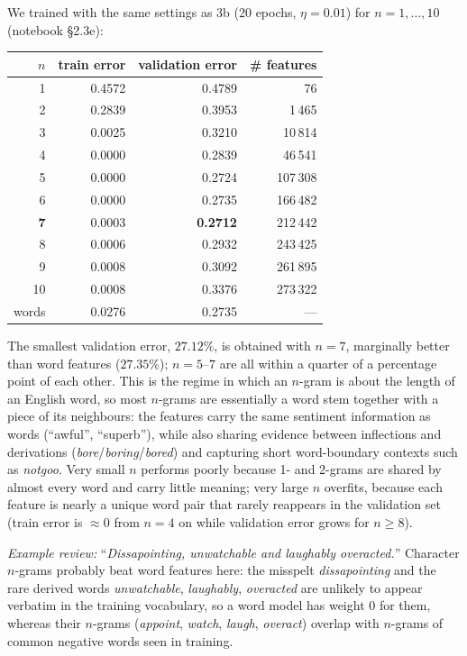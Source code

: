 \begin{solution}
We trained with the same settings as 3b (20 epochs, $\eta=0.01$) for $n=1,\dots,10$ (notebook \S2.3e):
\begin{center}
\begin{tabular}{rrrr}
\toprule
$n$ & train error & validation error & \# features \\
\midrule
1 & 0.4572 & 0.4789 & 76 \\
2 & 0.2839 & 0.3953 & 1\,465 \\
3 & 0.0025 & 0.3210 & 10\,814 \\
4 & 0.0000 & 0.2839 & 46\,541 \\
5 & 0.0000 & 0.2724 & 107\,308 \\
6 & 0.0000 & 0.2735 & 166\,482 \\
\textbf{7} & 0.0003 & \textbf{0.2712} & 212\,442 \\
8 & 0.0006 & 0.2932 & 243\,425 \\
9 & 0.0008 & 0.3092 & 261\,895 \\
10 & 0.0008 & 0.3376 & 273\,322 \\
\midrule
words & 0.0276 & 0.2735 & --- \\
\bottomrule
\end{tabular}
\end{center}
The smallest validation error, $27.12\%$, is obtained with $n=7$, marginally better than word features
($27.35\%$); $n=5$--$7$ are all within a quarter of a percentage point of each other. This is the regime in which an $n$-gram is
about the length of an English word, so most $n$-grams are essentially a word stem together with a piece of
its neighbours: the features carry the same sentiment information as words (``awful'', ``superb''), while
also sharing evidence between inflections and derivations (\emph{bore}/\emph{boring}/\emph{bored}) and
capturing short word-boundary contexts such as \emph{notgoo}. Very small $n$ performs poorly because 1- and
2-grams are shared by almost every word and carry little meaning; very large $n$ overfits, because each
feature is nearly a unique word pair that rarely reappears in the validation set (train error is $\approx0$
from $n=4$ on while validation error grows for $n\ge8$).

\emph{Example review:} ``\emph{Dissapointing, unwatchable and laughably overacted.}''
Character $n$-grams probably beat word features here: the misspelt \emph{dissapointing} and the rare
derived words \emph{unwatchable}, \emph{laughably}, \emph{overacted} are unlikely to appear verbatim in the
training vocabulary, so a word model has weight 0 for them, whereas their $n$-grams
(\emph{appoint}, \emph{watch}, \emph{laugh}, \emph{overact}) overlap with $n$-grams of common negative words
seen in training.
\end{solution}

